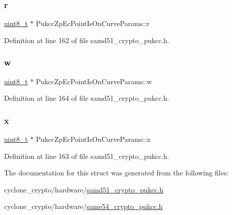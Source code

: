 \subsubsection{\texorpdfstring{r}{r}}
{\footnotesize\ttfamily \hyperlink{stdint_8h_aba7bc1797add20fe3efdf37ced1182c5}{uint8\+\_\+t} $\ast$ Pukcc\+Zp\+Ec\+Point\+Is\+On\+Curve\+Params\+::r}



Definition at line 162 of file samd51\+\_\+crypto\+\_\+pukcc.\+h.

\mbox{\label{structPukccZpEcPointIsOnCurveParams_a61dd44da18307b2728ad775385e3714b}} 
\subsubsection{\texorpdfstring{w}{w}}
{\footnotesize\ttfamily \hyperlink{stdint_8h_aba7bc1797add20fe3efdf37ced1182c5}{uint8\+\_\+t} $\ast$ Pukcc\+Zp\+Ec\+Point\+Is\+On\+Curve\+Params\+::w}



Definition at line 164 of file samd51\+\_\+crypto\+\_\+pukcc.\+h.

\mbox{\label{structPukccZpEcPointIsOnCurveParams_aef767e9a73923ea5d20df44cf89d7228}} 
\subsubsection{\texorpdfstring{x}{x}}
{\footnotesize\ttfamily \hyperlink{stdint_8h_aba7bc1797add20fe3efdf37ced1182c5}{uint8\+\_\+t} $\ast$ Pukcc\+Zp\+Ec\+Point\+Is\+On\+Curve\+Params\+::x}



Definition at line 163 of file samd51\+\_\+crypto\+\_\+pukcc.\+h.



The documentation for this struct was generated from the following files\+:\begin{DoxyCompactItemize}
\item 
cyclone\+\_\+crypto/hardware/\hyperlink{samd51__crypto__pukcc_8h}{samd51\+\_\+crypto\+\_\+pukcc.\+h}\item 
cyclone\+\_\+crypto/hardware/\hyperlink{same54__crypto__pukcc_8h}{same54\+\_\+crypto\+\_\+pukcc.\+h}\end{DoxyCompactItemize}
